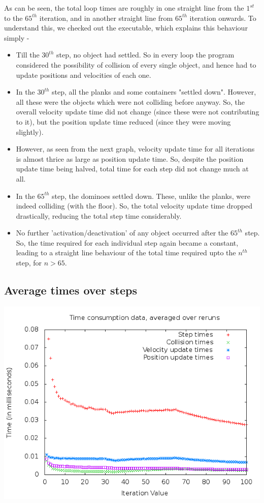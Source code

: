 \documentclass[a4paper,11pt]{article}
\begin{document}
			As can be seen, the total loop times are roughly in one straight line
			from the $1^{st}$ to the $65^{th}$ iteration, and in another straight
			line from $65^{th}$ iteration onwards. To understand this, we checked
			out the executable, which explains this behaviour simply -
			\begin{itemize}
				\item Till the $30^{th}$ step, no object had settled. So
				in every loop the program considered the possibility of collision of
				every single object, and hence had to update positions and velocities
				of each one.
				\item In the $30^{th}$ step, all the planks and some containers
				"settled down". However, all these were the objects which were not
				colliding before anyway. So, the overall velocity update time did
				not change (since these were not contributing to it), but the
				position update time reduced (since they were moving slightly).
				\item However, as seen from the next graph, velocity update time
				for all iterations is almost thrice as large as position update
				time. So, despite the position update time being halved, total time
				for each step did not change much at all.
				\item In the $65^{th}$ step, the dominoes settled down. These,
				unlike the planks, were indeed colliding (with the floor). So, the
				total velocity update time dropped drastically, reducing the total
				step time considerably.
				\item No further 'activation/deactivation' of any object occurred
				after the $65^{th}$ step. So, the time required for each individual
				step again became a constant, leading to a straight line behaviour
				of the total time required upto the $n^{th}$ step, for $n>65$.
			\end{itemize}
		
		\subsection{Average times over steps}
			\begin{center}
				\includegraphics[scale=0.5]{./doc/images/g16_plot02.png}
			\end{center}
			
\end{document}
